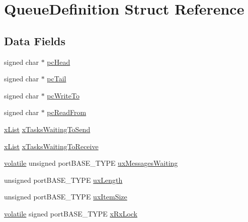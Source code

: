 \hypertarget{struct_queue_definition}{\section{Queue\-Definition Struct Reference}
\label{struct_queue_definition}
}
\subsection*{Data Fields}
\begin{DoxyCompactItemize}
\item 
signed char $\ast$ \hyperlink{struct_queue_definition_a8b980b74f28a8d1fd0c2ab860df8133d}{pc\-Head}
\item 
signed char $\ast$ \hyperlink{struct_queue_definition_a60913ddc7ca663b67ebfeb3c0d9fd5a0}{pc\-Tail}
\item 
signed char $\ast$ \hyperlink{struct_queue_definition_ad2d44e69d540b157de31c782c35be7dd}{pc\-Write\-To}
\item 
signed char $\ast$ \hyperlink{struct_queue_definition_a4f066b3c19c50a0d706c92bc4ce5c6c8}{pc\-Read\-From}
\item 
\hyperlink{_common_2_libraries_2_free_r_t_o_s_2_source_2include_2list_8h_a3cee7d8d40380f66ac73b8825b5a0fb0}{x\-List} \hyperlink{struct_queue_definition_a073ad0a31a51508395efd54599c73ee1}{x\-Tasks\-Waiting\-To\-Send}
\item 
\hyperlink{_common_2_libraries_2_free_r_t_o_s_2_source_2include_2list_8h_a3cee7d8d40380f66ac73b8825b5a0fb0}{x\-List} \hyperlink{struct_queue_definition_a3f26a41f0c0d17fc4645905b309b33aa}{x\-Tasks\-Waiting\-To\-Receive}
\item 
\hyperlink{group___c_m_s_i_s___core___instruction_interface_gad7d93af13046b0378601b85c8c16673b}{volatile} unsigned port\-B\-A\-S\-E\-\_\-\-T\-Y\-P\-E \hyperlink{struct_queue_definition_a8e3b24b25631daa65cc8b860346013e3}{ux\-Messages\-Waiting}
\item 
unsigned port\-B\-A\-S\-E\-\_\-\-T\-Y\-P\-E \hyperlink{struct_queue_definition_af1edbb7426dad16a57e1fc6bb475bc7e}{ux\-Length}
\item 
unsigned port\-B\-A\-S\-E\-\_\-\-T\-Y\-P\-E \hyperlink{struct_queue_definition_ad8719a7d6da96299b7ed158a621ae7e5}{ux\-Item\-Size}
\item 
\hyperlink{group___c_m_s_i_s___core___instruction_interface_gad7d93af13046b0378601b85c8c16673b}{volatile} signed port\-B\-A\-S\-E\-\_\-\-T\-Y\-P\-E \hyperlink{struct_queue_definition_ad7c6ccbee34deed4a438354a0d3cf765}{x\-Rx\-Lock}

\end{DoxyCompactItemize}
